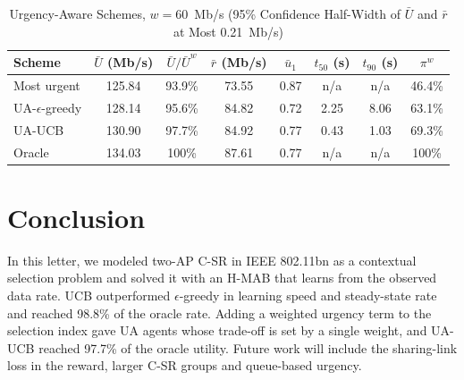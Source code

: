 \documentclass[journal]{IEEEtran}
\theoremstyle{definition}
\theoremstyle{remark}
\theoremstyle{plain}
\begin{document}
\begin{table}[t]
\caption{Urgency-Aware Schemes, $w=60$~Mb/s (95\% Confidence Half-Width of $\bar{U}$ and $\bar{r}$ at Most 0.21~Mb/s)}
\label{tab:aware}
\centering
\footnotesize
\setlength{\tabcolsep}{3pt}
\begin{tabular}{@{}lccccccc@{}}
\toprule
Scheme & $\bar{U}$ (Mb/s) & $\bar{U}/\bar{U}^w$ & $\bar{r}$ (Mb/s) & $\bar{u}_1$ & $t_{50}$ (s) & $t_{90}$ (s) & $\pi^w$\\
\midrule
Most urgent & 125.84 & 93.9\% & 73.55 & 0.87 & n/a & n/a & 46.4\%\\
UA-$\epsilon$-greedy & 128.14 & 95.6\% & 84.82 & 0.72 & 2.25 & 8.06 & 63.1\%\\
UA-UCB & 130.90 & 97.7\% & 84.92 & 0.77 & 0.43 & 1.03 & 69.3\%\\
Oracle & 134.03 & 100\% & 87.61 & 0.77 & n/a & n/a & 100\%\\
\bottomrule
\end{tabular}
\end{table}

\section{Conclusion}\label{sec5}
In this letter, we modeled two-AP C-SR in IEEE 802.11bn as a contextual selection problem and solved it with an H-MAB that learns from the observed data rate. UCB outperformed $\epsilon$-greedy in learning speed and steady-state rate and reached 98.8\% of the oracle rate. Adding a weighted urgency term to the selection index gave UA agents whose trade-off is set by a single weight, and UA-UCB reached 97.7\% of the oracle utility. Future work will include the sharing-link loss in the reward, larger C-SR groups and queue-based urgency.



\end{document}
